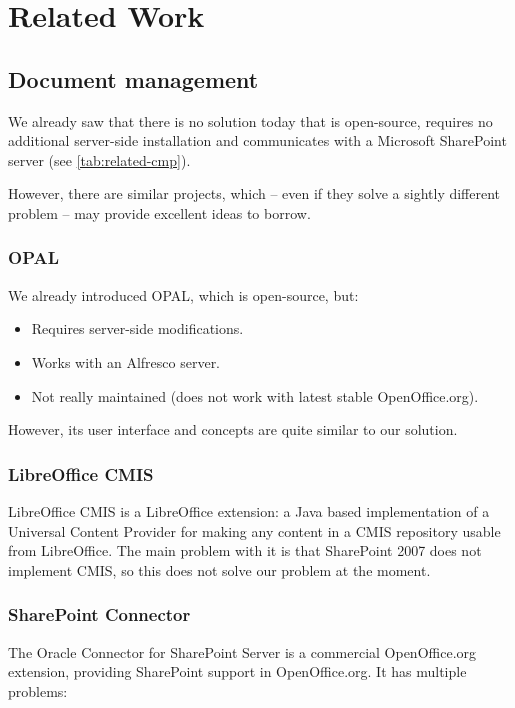 \chapter{Related Work}
\label{chap:related}

\section{Document management}

We already saw that there is no solution today that is open-source, requires no
additional server-side installation and communicates with a Microsoft
SharePoint server (see \autoref{tab:related-cmp}).

However, there are similar projects, which -- even if they
solve a sightly different problem -- may provide excellent ideas to borrow.

\subsection*{OPAL}
We already introduced OPAL, which is open-source, but:

\begin{itemize}
\item Requires server-side modifications.
\item Works with an Alfresco server.
\item Not really maintained (does not work with latest stable OpenOffice.org).
\end{itemize}

However, its user interface and concepts are quite similar to our solution.

\subsection*{LibreOffice CMIS}
LibreOffice CMIS \cite{locmis} is a LibreOffice extension: a Java based
implementation of a Universal Content Provider for making any content in a CMIS
repository usable from LibreOffice. The main problem with it is that SharePoint
2007 does not implement CMIS, so this does not solve our problem at the moment.

\subsection*{SharePoint Connector}
The Oracle Connector for SharePoint Server \cite{oracle-sp-connector} is a
commercial OpenOffice.org extension, providing SharePoint support in
OpenOffice.org. It has multiple problems:

